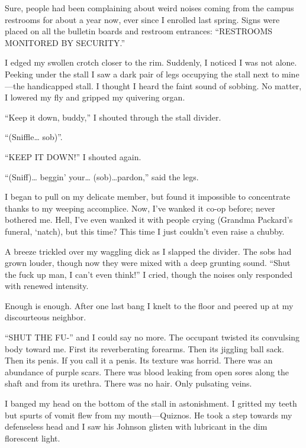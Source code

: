 Sure, people had been complaining about weird noises coming from
the campus restrooms for about a year now, ever since I enrolled
last spring. Signs were placed on all the bulletin boards and
restroom entrances: ``RESTROOMS MONITORED BY
SECURITY.''



I edged my swollen crotch closer to the rim. Suddenly, I noticed I
was not alone. Peeking under the stall I saw a dark pair of legs
occupying the stall next to mine---the handicapped stall. I
thought I heard the faint sound of sobbing. No matter, I lowered my
fly and gripped my quivering organ.



``Keep it down, buddy,'' I shouted through the stall
divider.

``(Sniffle{\ldots} sob)''.

``KEEP IT DOWN!'' I shouted again.

``(Sniff){\ldots} beggin' your{\ldots}
(sob){\ldots}pardon,'' said the legs.



I began to pull on my delicate member, but found it impossible to
concentrate thanks to my weeping accomplice. Now, I've wanked
it co-op before; never bothered me. Hell, I've even wanked it
with people crying (Grandma Packard's funeral, `natch),
but this time? This time I just couldn't even raise a
chubby.



A breeze trickled over my waggling dick as I slapped the divider.
The sobs had grown louder, though now they were mixed with a deep
grunting sound. ``Shut the fuck up man, I can't even
think!'' I cried, though the noises only responded with
renewed intensity.



Enough is enough. After one last bang I knelt to the floor and
peered up at my discourteous neighbor.



``SHUT THE FU-'' and I could say no more. The occupant
twisted its convulsing body toward me. First its reverberating
forearms. Then its jiggling ball sack. Then its penis. If you call
it a penis. Its texture was horrid. There was an abundance of
purple scars. There was blood leaking from open sores along the
shaft and from its urethra. There was no hair. Only pulsating
veins.



I banged my head on the bottom of the stall in astonishment. I
gritted my teeth but spurts of vomit flew from my
mouth---Quiznos. He took a step towards my defenseless head and
I saw his Johnson glisten with lubricant in the dim florescent
light.



